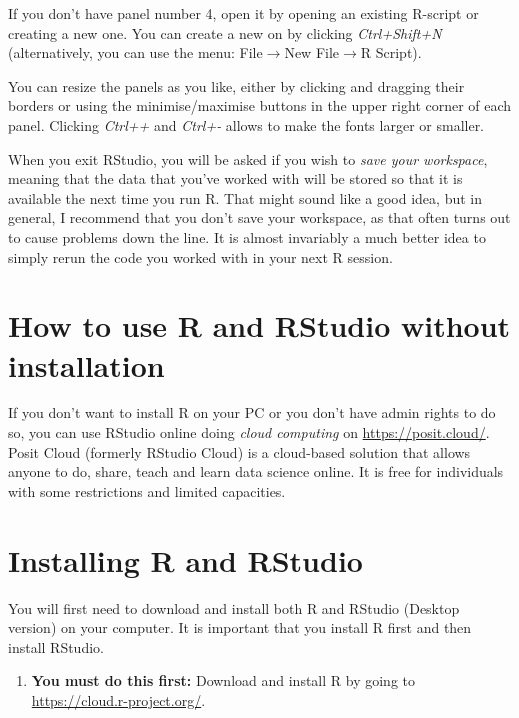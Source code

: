 \documentclass[
  12pt,
  oneside]{book}
\providecommand{\tightlist}{%
  \setlength{\itemsep}{0pt}\setlength{\parskip}{0pt}}
\theoremstyle{definition}
\theoremstyle{definition}
\theoremstyle{definition}
\theoremstyle{definition}
\theoremstyle{remark}
\begin{document}
If you don't have panel number 4, open it by opening an existing R-script or creating a new one. You can create a new on by clicking \emph{Ctrl+Shift+N} (alternatively, you can use the menu: File\(\rightarrow\)New File\(\rightarrow\)R Script).

You can resize the panels as you like, either by clicking and dragging their borders or using the minimise/maximise buttons in the upper right corner of each panel. Clicking \emph{Ctrl++} and \emph{Ctrl+-} allows to make the fonts larger or smaller.

When you exit RStudio, you will be asked if you wish to \emph{save your workspace}, meaning that the data that you've worked with will be stored so that it is available the next time you run R. That might sound like a good idea, but in general, I recommend that you don't save your workspace, as that often turns out to cause problems down the line. It is almost invariably a much better idea to simply rerun the code you worked with in your next R session.

\hypertarget{how-to-use-r-and-rstudio-without-installation}{%
\section{How to use R and RStudio without installation}\label{how-to-use-r-and-rstudio-without-installation}}

If you don't want to install R on your PC or you don't have admin rights to do so, you can use RStudio online doing \emph{cloud computing} on \url{https://posit.cloud/}.
Posit Cloud (formerly RStudio Cloud) is a cloud-based solution that allows anyone to do, share, teach and learn data science online. It is free for individuals with some restrictions and limited capacities.

\hypertarget{installing}{%
\section{Installing R and RStudio}\label{installing}}

You will first need to download and install both R and RStudio (Desktop version) on your computer. It is important that you install R first and then install RStudio.

\begin{enumerate}
\def\labelenumi{\arabic{enumi}.}
\tightlist
\item
  \textbf{You must do this first:} Download and install R by going to \url{https://cloud.r-project.org/}. 
\end{enumerate}
\end{document}
